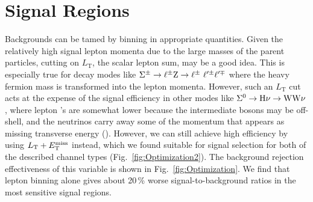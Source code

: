 \section{Signal Regions}
\label{sec:Optimization}


Backgrounds can be tamed by binning in appropriate quantities. Given the relatively high signal lepton momenta due to the large masses of the parent particles, cutting on $L_\textrm{T}$, the scalar lepton \pt sum, may be a good idea. This is especially true for decay modes like $\Sigma^\pm \to \ell^\pm \mathrm{Z} \to \ell^\pm ~ \ell^{\prime \pm} \ell^{\prime \mp}$ where the heavy fermion mass is transformed into the lepton momenta. However, such an $L_\textrm{T}$ cut acts at the expense of the signal efficiency in other modes like $\Sigma^0 \to \mathrm{H} \nu \to \mathrm{W}\mathrm{W}\nu$, where lepton \pt's are somewhat lower because the intermediate bosons may be off-shell, and the neutrinos carry away some of the momentum that appears as missing transverse energy (\MET). However, we can still achieve high efficiency by using $L_\textrm{T} + E_{\mathrm{T}}^{\text{miss}}$ instead, which we found suitable for signal selection for both of the described channel types (Fig.~\ref{fig:Optimization2}). The background rejection effectiveness of this variable is shown in Fig.~\ref{fig:Optimization}. We find that lepton \pt binning alone gives about 20\,\% worse signal-to-background ratios in the most sensitive signal regions.

